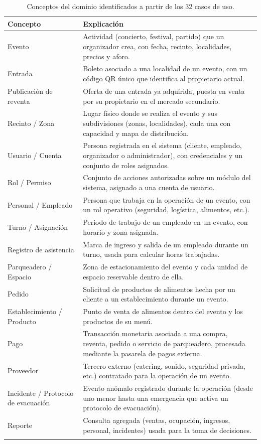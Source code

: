 \documentclass[11pt,a4paper]{article}
\begin{document}
\begin{center}
\begin{longtable}{p{3.8cm}p{9.7cm}}
\toprule
\textbf{Concepto} & \textbf{Explicación}\\
\midrule
\endhead
Evento & Actividad (concierto, festival, partido) que un organizador crea, con fecha, recinto,
localidades, precios y aforo.\\[0.3em]
Entrada & Boleto asociado a una localidad de un evento, con un código QR único que identifica al
propietario actual.\\[0.3em]
Publicación de reventa & Oferta de una entrada ya adquirida, puesta en venta por su propietario en
el mercado secundario.\\[0.3em]
Recinto / Zona & Lugar físico donde se realiza el evento y sus subdivisiones (zonas, localidades),
cada una con capacidad y mapa de distribución.\\[0.3em]
Usuario / Cuenta & Persona registrada en el sistema (cliente, empleado, organizador o
administrador), con credenciales y un conjunto de roles asignados.\\[0.3em]
Rol / Permiso & Conjunto de acciones autorizadas sobre un módulo del sistema, asignado a una
cuenta de usuario.\\[0.3em]
Personal / Empleado & Persona que trabaja en la operación de un evento, con un rol operativo
(seguridad, logística, alimentos, etc.).\\[0.3em]
Turno / Asignación & Periodo de trabajo de un empleado en un evento, con horario y zona
asignada.\\[0.3em]
Registro de asistencia & Marca de ingreso y salida de un empleado durante un turno, usada para
calcular horas trabajadas.\\[0.3em]
Parqueadero / Espacio & Zona de estacionamiento del evento y cada unidad de espacio reservable
dentro de ella.\\[0.3em]
Pedido & Solicitud de productos de alimentos hecha por un cliente a un establecimiento durante un
evento.\\[0.3em]
Establecimiento / Producto & Punto de venta de alimentos dentro del evento y los productos de su
menú.\\[0.3em]
Pago & Transacción monetaria asociada a una compra, reventa, pedido o servicio de parqueadero,
procesada mediante la pasarela de pagos externa.\\[0.3em]
Proveedor & Tercero externo (catering, sonido, seguridad privada, etc.) contratado para la
operación de un evento.\\[0.3em]
Incidente / Protocolo de evacuación & Evento anómalo registrado durante la operación (desde uno
menor hasta una emergencia que activa un protocolo de evacuación).\\[0.3em]
Reporte & Consulta agregada (ventas, ocupación, ingresos, personal, incidentes) usada para la
toma de decisiones.\\
\bottomrule
\caption{Conceptos del dominio identificados a partir de los 32 casos de uso.}
\end{longtable}
\end{center}
\end{document}
